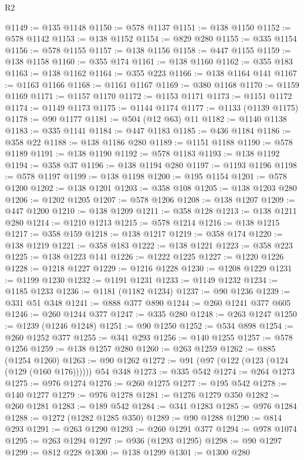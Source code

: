 \begin{lexlean}{R2}
\begin{coremodule}
@1149 := @135 @1148
@1150 := @578 @1137
@1151 := @138 @1150
@1152 := @578 @1142
@1153 := @138 @1152
@1154 := @829 @280
@1155 := @335 @1154
@1156 := @578 @1155
@1157 := @138 @1156
@1158 := @447 @1155
@1159 := @138 @1158
@1160 := @355 @174
@1161 := @138 @1160
@1162 := @355 @183
@1163 := @138 @1162
@1164 := @355 @223
@1166 := @138 @1164 @141
@1167 := @1163 @1166
@1168 := @1161 @1167
@1169 := @380 @1168
@1170 := @1159 @1169
@1171 := @1157 @1170
@1172 := @1153 @1171
@1173 := @1151 @1172
@1174 := @1149 @1173
@1175 := @1144 @1174
@1177 := @1133 (@1139 @1175)
@1178 := @90 @1177
@1181 := @504 (@12 @63) @11
@1182 := @1140 @1138
@1183 := @335 @1141
@1184 := @447 @1183
@1185 := @436 @1184
@1186 := @358 @22
@1188 := @138 @1186 @280
@1189 := @1151 @1188
@1190 := @578 @1189
@1191 := @138 @1190
@1192 := @578 @1183
@1193 := @138 @1192
@1194 := @358 @37
@1196 := @138 @1194 @280
@1197 := @1193 @1196
@1198 := @578 @1197
@1199 := @138 @1198
@1200 := @195 @1154
@1201 := @578 @1200
@1202 := @138 @1201
@1203 := @358 @108
@1205 := @138 @1203 @280
@1206 := @1202 @1205
@1207 := @578 @1206
@1208 := @138 @1207
@1209 := @447 @1200
@1210 := @138 @1209
@1211 := @358 @128
@1213 := @138 @1211 @280
@1214 := @1210 @1213
@1215 := @578 @1214
@1216 := @138 @1215
@1217 := @358 @159
@1218 := @138 @1217
@1219 := @358 @174
@1220 := @138 @1219
@1221 := @358 @183
@1222 := @138 @1221
@1223 := @358 @223
@1225 := @138 @1223 @141
@1226 := @1222 @1225
@1227 := @1220 @1226
@1228 := @1218 @1227
@1229 := @1216 @1228
@1230 := @1208 @1229
@1231 := @1199 @1230
@1232 := @1191 @1231
@1233 := @1149 @1232
@1234 := @1185 @1233
@1236 := @1181 (@1182 @1234)
@1237 := @90 @1236
@1239 := @331 @51 @348
@1241 := @888 @377 @890
@1244 := @260 @1241 @377 @605
@1246 := @260 @1244 @377
@1247 := @335 @280
@1248 := @263 @1247
@1250 := @1239 (@1246 @1248)
@1251 := @90 @1250
@1252 := @534 @898
@1254 := @260 @1252 @377
@1255 := @341 @293
@1256 := @140 @1255
@1257 := @578 @1256
@1259 := @138 @1257 @280
@1260 := @263 @1259
@1262 := @885 (@1254 @1260)
@1263 := @90 @1262
@1272 := @91 (@97 (@122 (@123 (@124 (@129 (@160 @176)))))) @54 @348
@1273 := @335 @542
@1274 := @264 @1273
@1275 := @976 @1274
@1276 := @260 @1275
@1277 := @195 @542
@1278 := @140 @1277
@1279 := @976 @1278
@1281 := @1276 @1279 @350
@1282 := @260 @1281
@1283 := @189 @542
@1284 := @341 @1283
@1285 := @976 @1284
@1288 := @1272 (@1282 @1285 @350)
@1289 := @90 @1288
@1290 := @814 @293
@1291 := @263 @1290
@1293 := @260 @1291 @377
@1294 := @978 @1074
@1295 := @263 @1294
@1297 := @936 (@1293 @1295)
@1298 := @90 @1297
@1299 := @812 @228
@1300 := @138 @1299
@1301 := @1300 @280

\end{coremodule}
\end{lexlean}
